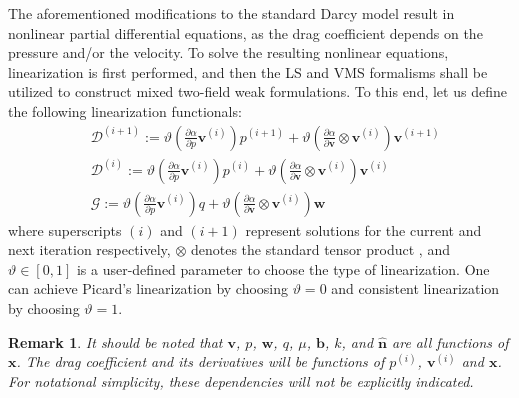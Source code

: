\documentclass[11pt,reqno]{amsart}
\newtheorem{remark}[theorem]{Remark}
\begin{document}
The aforementioned modifications to the standard 
Darcy model result in nonlinear partial differential 
equations, as the drag coefficient depends on the 
pressure and/or the velocity. To solve the resulting 
nonlinear equations, linearization is first performed, 
and then the LS and VMS formalisms shall be utilized 
to construct mixed two-field weak formulations. 
To this end, let us define the following linearization 
functionals:
\begin{align}
  \label{Eqn:Linearization_next}
  &\mathcal{D}^{(i+1)} := \vartheta 
  \left(\frac{\partial \alpha}{\partial p}
  \mathbf{v}^{(i)}\right)p^{(i+1)} + \vartheta 
  \left(\frac{\partial \alpha}{\partial\mathbf{v}}
  \otimes\mathbf{v}^{(i)}\right)\mathbf{v}^{(i+1)} \\
\label{Eqn:Linearization_current}
  &\mathcal{D}^{(i)} := \vartheta 
  \left(\frac{\partial \alpha}{\partial p} 
  \mathbf{v}^{(i)}\right) p^{(i)} + \vartheta 
  \left(\frac{\partial \alpha}{\partial\mathbf{v}}
  \otimes\mathbf{v}^{(i)}\right)\mathbf{v}^{(i)} \\
&\mathcal{G} := \vartheta \left(
  \frac{\partial \alpha}{\partial p}
  \mathbf{v}^{(i)}\right) q + \vartheta 
  \left(\frac{\partial \alpha}{\partial\mathbf{v}}
  \otimes\mathbf{v}^{(i)}\right)\mathbf{w}
\end{align}
where superscripts $(i)$ and $(i+1)$ represent 
solutions for the current and next iteration 
respectively, $\otimes$ denotes the standard 
tensor product \cite{Chadwick}, and $\vartheta 
\in [0 ,1]$ is a user-defined parameter to 
choose the type of linearization. One can 
achieve Picard's linearization by choosing 
$\vartheta = 0$ and consistent linearization 
by choosing $\vartheta = 1$.
\begin{remark}
  It should be noted that $\mathbf{v}$, $p$, $\mathbf{w}$, 
  $q$, $\mu$, $\mathbf{b}$, $k$, and $\hat{\mathbf{n}}$ 
  are all functions of $\mathbf{x}$. The drag coefficient 
  and its derivatives will be functions of $p^{(i)}$, 
  $\mathbf{v}^{(i)}$ and $\mathbf{x}$. For notational 
  simplicity, these dependencies will not be explicitly 
  indicated. 
\end{remark}
\end{document}
